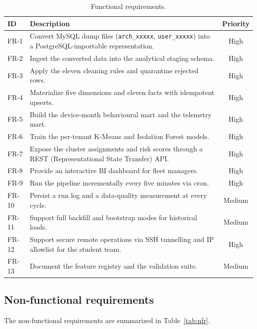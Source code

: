 \begin{table}[h]
\centering
\caption{Functional requirements.}
\label{tab:fr}
\begin{tabular}{|l|p{8.6cm}|c|}
\hline
\textbf{ID} & \textbf{Description} & \textbf{Priority} \\
\hline
FR-1 & Convert MySQL dump files (\texttt{arch\_xxxxx}, \texttt{user\_xxxxx}) into a PostgreSQL-importable representation. & High \\
FR-2 & Ingest the converted data into the analytical staging schema. & High \\
FR-3 & Apply the eleven cleaning rules and quarantine rejected rows. & High \\
FR-4 & Materialize five dimensions and eleven facts with idempotent upserts. & High \\
FR-5 & Build the device-month behavioural mart and the telemetry mart. & High \\
FR-6 & Train the per-tenant K-Means and Isolation Forest models. & High \\
FR-7 & Expose the cluster assignments and risk scores through a REST (Representational State Transfer) API. & High \\
FR-8 & Provide an interactive BI dashboard for fleet managers. & High \\
FR-9 & Run the pipeline incrementally every five minutes via cron. & High \\
FR-10 & Persist a run log and a data-quality measurement at every cycle. & Medium \\
FR-11 & Support full backfill and bootstrap modes for historical loads. & Medium \\
FR-12 & Support secure remote operations via SSH tunnelling and IP allowlist for the student team. & High \\
FR-13 & Document the feature registry and the validation suite. & Medium \\
\hline
\end{tabular}
\end{table}

\subsection{Non-functional requirements}
The non-functional requirements are summarized in Table~\ref{tab:nfr}.

